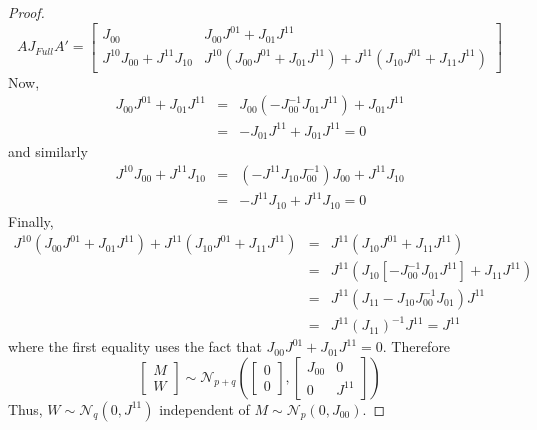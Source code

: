 \documentclass[12pt]{article}
\theoremstyle{definition}
\begin{document}
\begin{proof}
	$$
	AJ_{Full}A' = \left[\begin{array}{cc}
		J_{00}& J_{00}J^{01}+J_{01}J^{11}\\
		J^{10}J_{00}+J^{11}J_{10}& J^{10}\left(J_{00}J^{01}+J_{01}J^{11}\right) + J^{11}\left(J_{10}J^{01}+J_{11}J^{11}\right)
	\end{array}\right]
$$
Now,
	\begin{eqnarray*}
		 J_{00}J^{01}+J_{01}J^{11} &=& J_{00}\left(-J_{00}^{-1}J_{01}J^{11}\right)+J_{01}J^{11} \\
			&=&  -J_{01}J^{11}+J_{01}J^{11} = 0 
	\end{eqnarray*}
and similarly
	\begin{eqnarray*}
		J^{10}J_{00}+J^{11}J_{10} &=& \left(-J^{11}J_{10}J_{00}^{-1}\right)J_{00}+J^{11}J_{10}\\
			&=& -J^{11}J_{10}+J^{11}J_{10} = 0
\end{eqnarray*}
Finally,
	\begin{eqnarray*}
		J^{10}\left(J_{00}J^{01}+J_{01}J^{11}\right) + J^{11}\left(J_{10}J^{01}+J_{11}J^{11}\right) &=& J^{11}\left(J_{10}J^{01}+J_{11}J^{11}\right)\\
		&=&J^{11}\left(J_{10}\left[-J_{00}^{-1}J_{01}J^{11}\right]+J_{11}J^{11}\right)\\
		&=&J^{11}\left(J_{11}-J_{10}J_{00}^{-1}J_{01}\right)J^{11}\\
		&=&J^{11}\left(J_{11}\right)^{-1}J^{11}=J^{11}
\end{eqnarray*}
where the first equality uses the fact that $J_{00}J^{01}+J_{01}J^{11} =0$. Therefore
	$$
	\left[\begin{array}{c}
		M\\
		W
	\end{array}\right] \sim \mathcal{N}_{p+q}\left(
	\left[\begin{array}{c}
		0\\
		0
	\end{array}\right],
	\left[\begin{array}{cc}
		J_{00}&0\\
		0&J^{11}
	\end{array}\right]\right)
$$
Thus, $W\sim \mathcal{N}_q(0,J^{11})$ independent of $M\sim\mathcal{N}_p(0,J_{00})$.
\end{proof}
\end{document}
